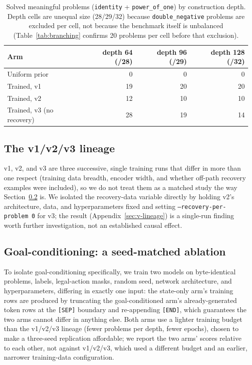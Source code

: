 \documentclass[11pt]{article}
\numberwithin{equation}{section}
\begin{document}
\begin{table}[htbp]
\centering
\small
\begin{tabular}{@{}lrrr@{}}
\toprule
Arm & depth 64 (/28) & depth 96 (/29) & depth 128 (/32) \\
\midrule
Uniform prior & 0 & 0 & 0 \\
Trained, v1 & 19 & 20 & 20 \\
Trained, v2 & 12 & 10 & 10 \\
Trained, v3 (no recovery) & 28 & 19 & 14 \\
\bottomrule
\end{tabular}
\caption{Solved meaningful problems (\texttt{identity} + \texttt{power\_of\_one}) by construction depth. Depth cells are unequal size (28/29/32) because \texttt{double\_negative} problems are excluded per cell, not because the benchmark itself is unbalanced (Table~\ref{tab:branching} confirms 20 problems per cell before that exclusion).}
\label{tab:depth}
\end{table}

\subsection{The v1/v2/v3 lineage}
\label{sec:v-lineage-summary}

v1, v2, and v3 are three successive, single training runs that differ in more than one respect (training data breadth, encoder width, and whether off-path recovery examples were included), so we do not treat them as a matched study the way Section~\ref{sec:ablation} is. We isolated the recovery-data variable directly by holding v2's architecture, data, and hyperparameters fixed and setting \texttt{--recovery-per-problem 0} for v3; the result (Appendix~\ref{sec:v-lineage}) is a single-run finding worth further investigation, not an established causal effect.

\subsection{Goal-conditioning: a seed-matched ablation}
\label{sec:ablation}

To isolate goal-conditioning specifically, we train two models on byte-identical problems, labels, legal-action masks, random seed, network architecture, and hyperparameters, differing in exactly one input: the state-only arm's training rows are produced by truncating the goal-conditioned arm's already-generated token rows at the \texttt{[SEP]} boundary and re-appending \texttt{[END]}, which guarantees the two arms cannot differ in anything else. Both arms use a lighter training budget than the v1/v2/v3 lineage (fewer problems per depth, fewer epochs), chosen to make a three-seed replication affordable; we report the two arms' scores relative to each other, not against v1/v2/v3, which used a different budget and an earlier, narrower training-data configuration.
\end{document}
